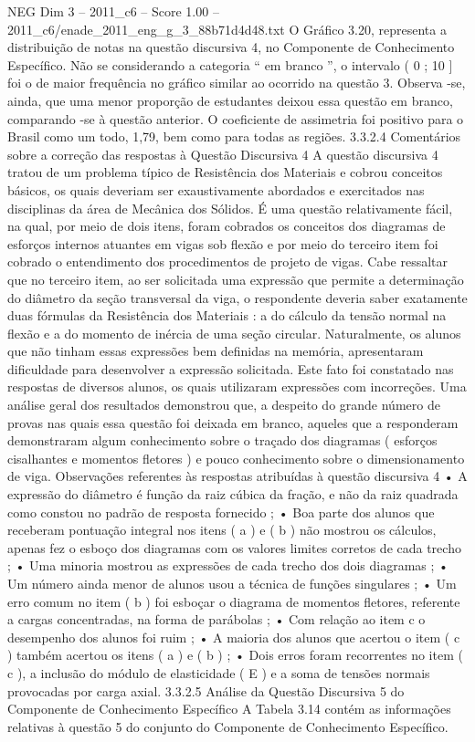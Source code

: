 \begin{textsample}{NEG Dim 3 – 2011\_c6 – Score 1.00 – 2011\_c6/enade\_2011\_eng\_g\_3\_88b71d4d48.txt}
O Gráfico 3.20, representa a distribuição de notas na questão discursiva 4, no Componente de Conhecimento Específico.
Não se considerando a categoria “ em branco ”, o intervalo ( 0 ; 10 ] foi o de maior frequência no gráfico similar ao ocorrido na questão 3.
Observa -se, ainda, que uma menor proporção de estudantes deixou essa questão em branco, comparando -se à questão anterior.
O coeficiente de assimetria foi positivo para o Brasil como um todo, 1,79, bem como para todas as regiões. 3.3.2.4 Comentários sobre a correção das respostas à Questão Discursiva 4 A questão discursiva 4 tratou de um problema típico de Resistência dos Materiais e cobrou conceitos básicos, os quais deveriam ser exaustivamente abordados e exercitados nas disciplinas da área de Mecânica dos Sólidos.
É uma questão relativamente fácil, na qual, por meio de dois itens, foram cobrados os conceitos dos diagramas de esforços internos atuantes em vigas sob flexão e por meio do terceiro item foi cobrado o entendimento dos procedimentos de projeto de vigas.
Cabe ressaltar que no terceiro item, ao ser solicitada uma expressão que permite a determinação do diâmetro da seção transversal da viga, o respondente deveria saber exatamente duas fórmulas da Resistência dos Materiais : a do cálculo da tensão normal na flexão e a do momento de inércia de uma seção circular.
Naturalmente, os alunos que não tinham essas expressões bem definidas na memória, apresentaram dificuldade para desenvolver a expressão solicitada.
Este fato foi constatado nas respostas de diversos alunos, os quais utilizaram expressões com incorreções.
Uma análise geral dos resultados demonstrou que, a despeito do grande número de provas nas quais essa questão foi deixada em branco, aqueles que a responderam demonstraram algum conhecimento sobre o traçado dos diagramas ( esforços cisalhantes e momentos fletores ) e pouco conhecimento sobre o dimensionamento de viga.
Observações referentes às respostas atribuídas à questão discursiva 4 • A expressão do diâmetro é função da raiz cúbica da fração, e não da raiz quadrada como constou no padrão de resposta fornecido ; • Boa parte dos alunos que receberam pontuação integral nos itens ( a ) e ( b ) não mostrou os cálculos, apenas fez o esboço dos diagramas com os valores limites corretos de cada trecho ; • Uma minoria mostrou as expressões de cada trecho dos dois diagramas ; • Um número ainda menor de alunos usou a técnica de funções singulares ; • Um erro comum no item ( b ) foi esboçar o diagrama de momentos fletores, referente a cargas concentradas, na forma de parábolas ; • Com relação ao item c o desempenho dos alunos foi ruim ; • A maioria dos alunos que acertou o item ( c ) também acertou os itens ( a ) e ( b ) ; • Dois erros foram recorrentes no item ( c ), a inclusão do módulo de elasticidade ( E ) e a soma de tensões normais provocadas por carga axial. 3.3.2.5 Análise da Questão Discursiva 5 do Componente de Conhecimento Específico A Tabela 3.14 contém as informações relativas à questão 5 do conjunto do Componente de Conhecimento Específico.

\end{textsample}
